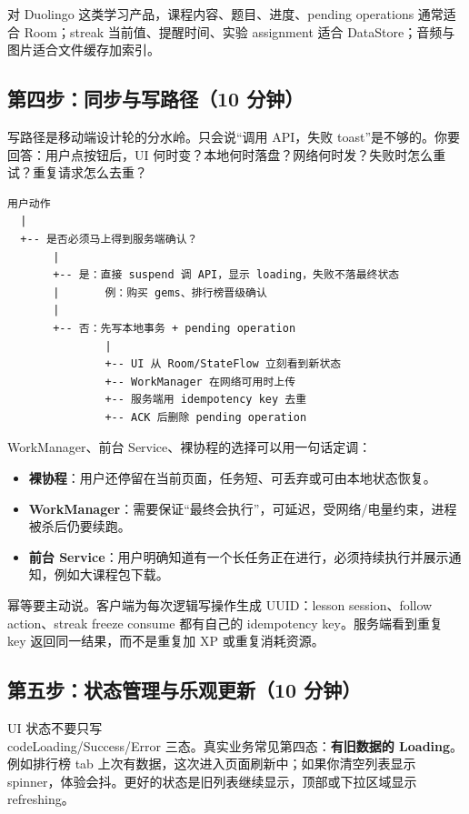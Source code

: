 \srcinferred 对 Duolingo 这类学习产品，课程内容、题目、进度、pending operations 通常适合 Room；streak 当前值、提醒时间、实验 assignment 适合 DataStore；音频与图片适合文件缓存加索引。

\subsection{第四步：同步与写路径（10 分钟）}

写路径是移动端设计轮的分水岭。只会说“调用 API，失败 toast”是不够的。你要回答：用户点按钮后，UI 何时变？本地何时落盘？网络何时发？失败时怎么重试？重复请求怎么去重？

\begin{lstlisting}
用户动作
  |
  +-- 是否必须马上得到服务端确认？
       |
       +-- 是：直接 suspend 调 API，显示 loading，失败不落最终状态
       |       例：购买 gems、排行榜晋级确认
       |
       +-- 否：先写本地事务 + pending operation
               |
               +-- UI 从 Room/StateFlow 立刻看到新状态
               +-- WorkManager 在网络可用时上传
               +-- 服务端用 idempotency key 去重
               +-- ACK 后删除 pending operation
\end{lstlisting}

WorkManager、前台 Service、裸协程的选择可以用一句话定调：

\begin{itemize}
  \item \textbf{裸协程}：用户还停留在当前页面，任务短、可丢弃或可由本地状态恢复。
  \item \textbf{WorkManager}：需要保证“最终会执行”，可延迟，受网络/电量约束，进程被杀后仍要续跑。
  \item \textbf{前台 Service}：用户明确知道有一个长任务正在进行，必须持续执行并展示通知，例如大课程包下载。
\end{itemize}

幂等要主动说。客户端为每次逻辑写操作生成 UUID：lesson session、follow action、streak freeze consume 都有自己的 idempotency key。服务端看到重复 key 返回同一结果，而不是重复加 XP 或重复消耗资源。

\subsection{第五步：状态管理与乐观更新（10 分钟）}

UI 状态不要只写 \\code{Loading/Success/Error} 三态。真实业务常见第四态：\textbf{有旧数据的 Loading}。例如排行榜 tab 上次有数据，这次进入页面刷新中；如果你清空列表显示 spinner，体验会抖。更好的状态是旧列表继续显示，顶部或下拉区域显示 refreshing。

